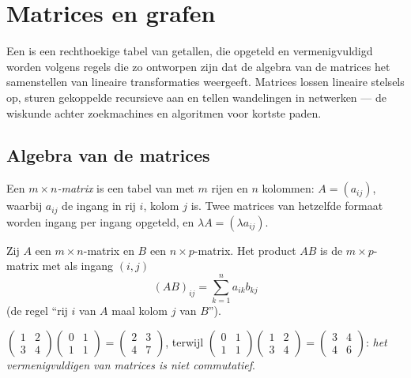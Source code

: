 \chapter{Matrices en grafen}\label{ch:g12:matrix}

Een  is een rechthoekige tabel van getallen, die opgeteld en
vermenigvuldigd worden volgens regels die zo ontworpen zijn dat de algebra van
de matrices het samenstellen van lineaire transformaties weergeeft. Matrices
lossen lineaire stelsels op, sturen gekoppelde recursieve  aan en tellen
wandelingen in netwerken --- de wiskunde achter zoekmachines en algoritmen
voor kortste paden.

\section{Algebra van de matrices}

\begin{definition}[Matrix]\label{def:g12:matrix:matrix}
Een \emph{$m \times n$-matrix} is een tabel van 
met $m$ rijen en $n$ kolommen: $A = (a_{ij})$, waarbij $a_{ij}$ de ingang in
rij $i$, kolom $j$ is. Twee matrices van hetzelfde formaat worden ingang per
ingang opgeteld, en $\lambda A = (\lambda a_{ij})$.
\end{definition}

\begin{definition}\label{def:g12:matrix:product}
Zij $A$ een $m \times n$-matrix en $B$ een $n \times p$-matrix. Het product
$AB$ is de $m \times p$-matrix met als ingang $(i,j)$
\[
(AB)_{ij} = \sum_{k=1}^{n} a_{ik} b_{kj}
\]
(de regel ``rij $i$ van $A$ maal kolom $j$ van $B$'').
\end{definition}

\begin{example}
$\begin{pmatrix} 1 & 2\\ 3 & 4\end{pmatrix}
\begin{pmatrix} 0 & 1\\ 1 & 1\end{pmatrix}
= \begin{pmatrix} 2 & 3\\ 4 & 7\end{pmatrix}$,
\quad terwijl \quad
$\begin{pmatrix} 0 & 1\\ 1 & 1\end{pmatrix}
\begin{pmatrix} 1 & 2\\ 3 & 4\end{pmatrix}
= \begin{pmatrix} 3 & 4\\ 4 & 6\end{pmatrix}$:
\emph{het vermenigvuldigen van matrices is niet commutatief}.
\end{example}

